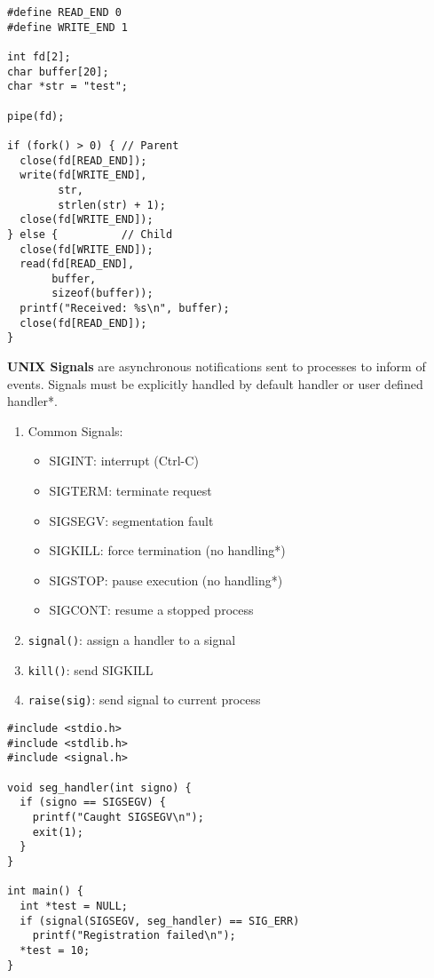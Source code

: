 \documentclass[12pt, a4paper]{article}
\begin{document}
\begin{multicols*}{3}
\begin{lstlisting}
#define READ_END 0 
#define WRITE_END 1 

int fd[2];
char buffer[20];
char *str = "test";

pipe(fd);

if (fork() > 0) { // Parent
  close(fd[READ_END]);
  write(fd[WRITE_END],
        str,
        strlen(str) + 1);
  close(fd[WRITE_END]);
} else {          // Child
  close(fd[WRITE_END]);
  read(fd[READ_END],
       buffer,
       sizeof(buffer));
  printf("Received: %s\n", buffer);
  close(fd[READ_END]);
}
\end{lstlisting}

\colbreak
\textbf{UNIX Signals} are asynchronous notifications sent to processes to inform of events. Signals must be explicitly handled by default handler or user defined handler*. 
\begin{enumerate}[\roman*.]
  \item Common Signals:
      \begin{itemize}[leftmargin=*]
        \item SIGINT: interrupt (Ctrl-C)
        \item SIGTERM: terminate request
        \item SIGSEGV: segmentation fault
        \item SIGKILL: force termination (no handling*)
        \item SIGSTOP: pause execution (no handling*)
        \item SIGCONT: resume a stopped process
      \end{itemize}
  \item \lstinline|signal()|: assign a handler to a signal
  \item \lstinline|kill()|: send SIGKILL
  \item \lstinline|raise(sig)|: send signal to current process
\end{enumerate}

\begin{lstlisting}
#include <stdio.h>
#include <stdlib.h>
#include <signal.h> 

void seg_handler(int signo) {
  if (signo == SIGSEGV) {
    printf("Caught SIGSEGV\n");
    exit(1);
  }
}

int main() {
  int *test = NULL;
  if (signal(SIGSEGV, seg_handler) == SIG_ERR)
    printf("Registration failed\n");
  *test = 10;
}
\end{lstlisting}

\colbreak

\end{multicols*}
\end{document}
